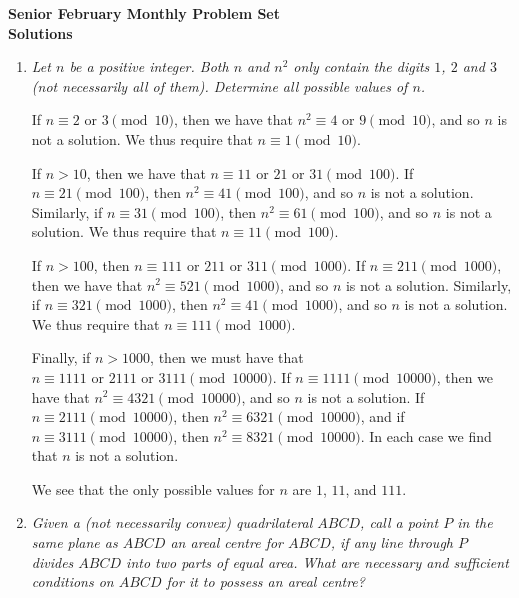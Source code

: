 \documentclass{article}
\begin{document}
\begin{center}
\textbf{\Large Senior February Monthly Problem Set}
\\ \vspace{1em}
\textbf{\large Solutions}
\end{center}

\begin{enumerate}[1.]

\item %
{\itshape Let $n$ be a positive integer. Both $n$ and $n^2$ only contain the digits $1$, $2$ and $3$ (not necessarily all of them). Determine all possible values of $n$.}

If $n \equiv 2 \text{ or } 3 \pmod{10}$, then we have that $n^2 \equiv 4 \text{ or } 9 \pmod{10}$, and so $n$ is not a solution. We thus require that $n \equiv 1 \pmod{10}$.

If $n > 10$, then we have that $n \equiv 11 \text{ or } 21 \text{ or } 31 \pmod{100}$. If $n \equiv 21 \pmod{100}$, then $n^2 \equiv 41 \pmod{100}$, and so $n$ is not a solution. Similarly, if $n \equiv 31 \pmod{100}$, then $n^2 \equiv 61 \pmod{100}$, and so $n$ is not a solution. We thus require that $n \equiv 11 \pmod{100}$.

If $n > 100$, then $n \equiv 111 \text{ or } 211 \text{ or } 311 \pmod{1000}$. If $n \equiv 211 \pmod{1000}$, then we have that $n^2 \equiv 521 \pmod{1000}$, and so $n$ is not a solution. Similarly, if $n \equiv 321 \pmod{1000}$, then $n^2 \equiv 41 \pmod{1000}$, and so $n$ is not a solution. We thus require that $n \equiv 111 \pmod{1000}$.

Finally, if $n > 1000$, then we must have that $n \equiv 1111 \text{ or } 2111 \text{ or } 3111 \pmod{10000}$. If $n \equiv 1111 \pmod{10000}$, then we have that $n^2 \equiv 4321 \pmod{10000}$, and so $n$ is not a solution. If $n \equiv 2111 \pmod{10000}$, then $n^2 \equiv 6321 \pmod{10000}$, and if $n \equiv 3111 \pmod{10000}$, then $n^2 \equiv 8321 \pmod{10000}$. In each case we find that $n$ is not a solution.

We see that the only possible values for $n$ are $1$, $11$, and $111$.


\vspace{6pt}
\item\label{prob:areal_centre} %
{\itshape Given a (not necessarily convex) quadrilateral $ABCD$, call a point $P$ in the same plane as $ABCD$ an \emph{areal centre} for $ABCD$, if any line through $P$ divides $ABCD$ into two parts of equal area. What are necessary and sufficient conditions on $ABCD$ for it to possess an areal centre?}


\end{enumerate}
\end{document}

